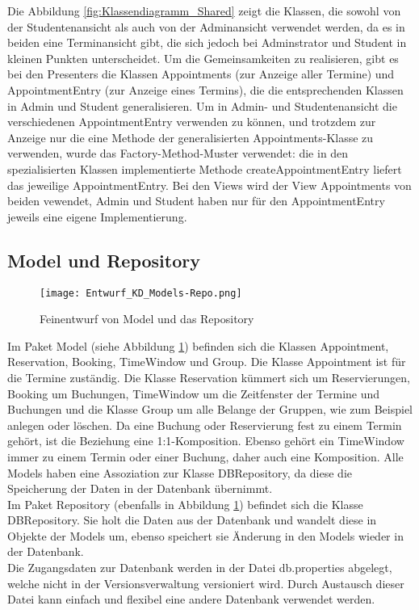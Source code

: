  Die Abbildung \ref{fig:Klassendiagramm_Shared} zeigt die Klassen, die sowohl von der Studentenansicht als auch von der Adminansicht verwendet werden, da es in beiden eine Terminansicht gibt, die sich jedoch bei Adminstrator und Student in kleinen Punkten unterscheidet.
 Um die Gemeinsamkeiten zu realisieren, gibt es bei den Presenters die Klassen Appointments (zur Anzeige aller Termine) und AppointmentEntry (zur Anzeige eines Termins), die die entsprechenden Klassen in Admin und Student generalisieren.
 Um in Admin- und Studentenansicht die verschiedenen AppointmentEntry verwenden zu können, und trotzdem zur Anzeige nur die eine Methode der generalisierten Appointments-Klasse zu verwenden, wurde das Factory-Method-Muster verwendet: die in den spezialisierten Klassen implementierte Methode createAppointmentEntry liefert das jeweilige AppointmentEntry.
 Bei den Views wird der View Appointments von beiden vewendet, Admin und Student haben nur für den AppointmentEntry jeweils eine eigene Implementierung.

 \subsection{Model und Repository}
 \begin{figure}
  \texttt{[image: Entwurf\_KD\_Models-Repo.png]}
  \label{fig:Klassendiagramm_Models-Repo}
\caption{Feinentwurf von Model und das Repository}
 \end{figure}

Im Paket Model (siehe Abbildung \ref{fig:Klassendiagramm_Models-Repo}) befinden sich die Klassen Appointment, Reservation, Booking, TimeWindow und Group. Die Klasse Appointment ist für die Termine zuständig. Die Klasse Reservation kümmert sich um Reservierungen, Booking um Buchungen, TimeWindow um die Zeitfenster der Termine und Buchungen und die Klasse Group um alle Belange der Gruppen, wie zum Beispiel anlegen oder löschen.
Da eine Buchung oder Reservierung fest zu einem Termin gehört, ist die Beziehung eine 1:1-Komposition. Ebenso gehört ein TimeWindow immer zu einem Termin oder einer Buchung, daher auch eine Komposition.
Alle Models haben eine Assoziation zur Klasse DBRepository, da diese die Speicherung der Daten in der Datenbank übernimmt.
\\

Im Paket Repository (ebenfalls in Abbildung \ref{fig:Klassendiagramm_Models-Repo}) befindet sich die Klasse DBRepository. Sie holt die Daten aus der Datenbank und wandelt diese in Objekte der Models um, ebenso speichert sie Änderung in den Models wieder in der Datenbank. \\
Die Zugangsdaten zur Datenbank werden in der Datei db.properties abgelegt, welche nicht in der Versionsverwaltung versioniert wird. Durch Austausch dieser Datei kann einfach und flexibel eine andere Datenbank verwendet werden.
